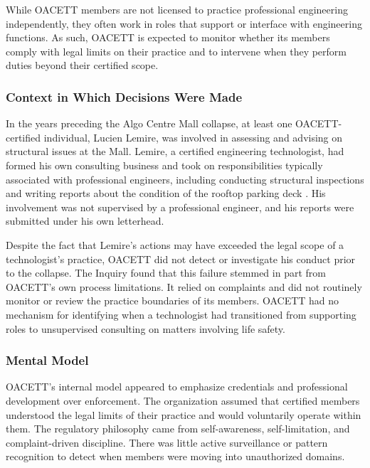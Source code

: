 \documentclass[12pt]{article}
\begin{document}
While OACETT members are not licensed to practice professional engineering independently, they often work in roles that support or interface with engineering functions. As such, OACETT is expected to monitor whether its members comply with legal limits on their practice and to intervene when they perform duties beyond their certified scope.

\subsubsection*{Context in Which Decisions Were Made}

In the years preceding the Algo Centre Mall collapse, at least one OACETT-certified individual, Lucien Lemire, was involved in assessing and advising on structural issues at the Mall. Lemire, a certified engineering technologist, had formed his own consulting business and took on responsibilities typically associated with professional engineers, including conducting structural inspections and writing reports about the condition of the rooftop parking deck \cite[p398-399]{AlgoLakeReport1}. His involvement was not supervised by a professional engineer, and his reports were submitted under his own letterhead.

Despite the fact that Lemire's actions may have exceeded the legal scope of a technologist's practice, OACETT did not detect or investigate his conduct prior to the collapse. The Inquiry found that this failure stemmed in part from OACETT's own process limitations. It relied on complaints and did not routinely monitor or review the practice boundaries of its members. OACETT had no mechanism for identifying when a technologist had transitioned from supporting roles to unsupervised consulting on matters involving life safety.

\subsubsection*{Mental Model}

OACETT's internal model appeared to emphasize credentials and professional development over enforcement. The organization assumed that certified members understood the legal limits of their practice and would voluntarily operate within them. The regulatory philosophy came from self-awareness, self-limitation, and complaint-driven discipline. There was little active surveillance or pattern recognition to detect when members were moving into unauthorized domains.
\end{document}
